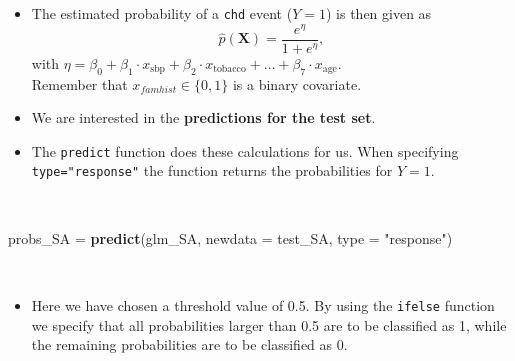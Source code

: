 \documentclass[
  10pt,
  ignorenonframetext,
]{beamer}
\newenvironment{Shaded}{\begin{snugshade}}{\end{snugshade}}
\newcommand{\AttributeTok}[1]{\textcolor[rgb]{0.13,0.29,0.53}{#1}}
\newcommand{\FunctionTok}[1]{\textcolor[rgb]{0.13,0.29,0.53}{\textbf{#1}}}
\newcommand{\NormalTok}[1]{#1}
\newcommand{\OtherTok}[1]{\textcolor[rgb]{0.56,0.35,0.01}{#1}}
\newcommand{\StringTok}[1]{\textcolor[rgb]{0.31,0.60,0.02}{#1}}
\providecommand{\tightlist}{%
  \setlength{\itemsep}{0pt}\setlength{\parskip}{0pt}}
\begin{document}
\begin{frame}[fragile]
\begin{itemize}
\tightlist
\item
  The estimated probability of a \texttt{chd} event (\(Y=1\)) is then
  given as \[\hat{p}(\mathbf{X}) =\frac{e^\eta}{1+e^\eta} ,\] with
  \(\eta=\beta_0 + \beta_1 \cdot x_{\text{sbp}} + \beta_2\cdot x_{\text{tobacco}} + \ldots + \beta_7\cdot x_{\text{age}}\).\\
  Remember that \(x_{famhist} \in \{0,1\}\) is a binary covariate.
\end{itemize}

\vspace{2mm}

\begin{itemize}
\tightlist
\item
  We are interested in the \textbf{predictions for the test set}.
\end{itemize}
\end{frame}

\begin{frame}[fragile]
\begin{itemize}
\tightlist
\item
  The \texttt{predict} function does these calculations for us. When
  specifying \texttt{type="response"} the function returns the
  probabilities for \(Y=1\).
\end{itemize}

\(~\)

\scriptsize

\begin{Shaded}
\begin{Highlighting}[]
\NormalTok{probs\_SA }\OtherTok{=} \FunctionTok{predict}\NormalTok{(glm\_SA, }\AttributeTok{newdata =}\NormalTok{ test\_SA, }\AttributeTok{type =} \StringTok{"response"}\NormalTok{)}
\end{Highlighting}
\end{Shaded}

\(~\)

\normalsize

\begin{itemize}
\tightlist
\item
  Here we have chosen a threshold value of 0.5. By using the
  \texttt{ifelse} function we specify that all probabilities larger than
  0.5 are to be classified as 1, while the remaining probabilities are
  to be classified as 0.
\end{itemize}
\end{frame}
\end{document}
